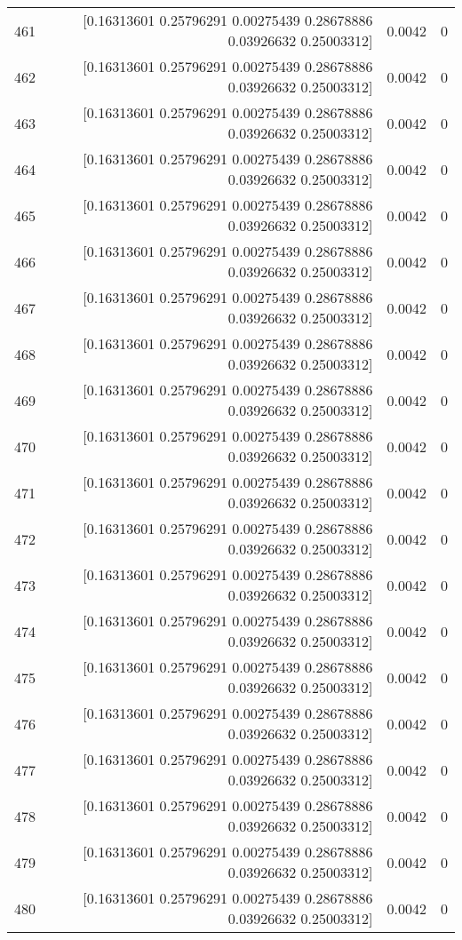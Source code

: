 \begin{longtable}{lrrr}
461 & [0.16313601 0.25796291 0.00275439 0.28678886 0.03926632 0.25003312] & 0.0042 & 0 \\
462 & [0.16313601 0.25796291 0.00275439 0.28678886 0.03926632 0.25003312] & 0.0042 & 0 \\
463 & [0.16313601 0.25796291 0.00275439 0.28678886 0.03926632 0.25003312] & 0.0042 & 0 \\
464 & [0.16313601 0.25796291 0.00275439 0.28678886 0.03926632 0.25003312] & 0.0042 & 0 \\
465 & [0.16313601 0.25796291 0.00275439 0.28678886 0.03926632 0.25003312] & 0.0042 & 0 \\
466 & [0.16313601 0.25796291 0.00275439 0.28678886 0.03926632 0.25003312] & 0.0042 & 0 \\
467 & [0.16313601 0.25796291 0.00275439 0.28678886 0.03926632 0.25003312] & 0.0042 & 0 \\
468 & [0.16313601 0.25796291 0.00275439 0.28678886 0.03926632 0.25003312] & 0.0042 & 0 \\
469 & [0.16313601 0.25796291 0.00275439 0.28678886 0.03926632 0.25003312] & 0.0042 & 0 \\
470 & [0.16313601 0.25796291 0.00275439 0.28678886 0.03926632 0.25003312] & 0.0042 & 0 \\
471 & [0.16313601 0.25796291 0.00275439 0.28678886 0.03926632 0.25003312] & 0.0042 & 0 \\
472 & [0.16313601 0.25796291 0.00275439 0.28678886 0.03926632 0.25003312] & 0.0042 & 0 \\
473 & [0.16313601 0.25796291 0.00275439 0.28678886 0.03926632 0.25003312] & 0.0042 & 0 \\
474 & [0.16313601 0.25796291 0.00275439 0.28678886 0.03926632 0.25003312] & 0.0042 & 0 \\
475 & [0.16313601 0.25796291 0.00275439 0.28678886 0.03926632 0.25003312] & 0.0042 & 0 \\
476 & [0.16313601 0.25796291 0.00275439 0.28678886 0.03926632 0.25003312] & 0.0042 & 0 \\
477 & [0.16313601 0.25796291 0.00275439 0.28678886 0.03926632 0.25003312] & 0.0042 & 0 \\
478 & [0.16313601 0.25796291 0.00275439 0.28678886 0.03926632 0.25003312] & 0.0042 & 0 \\
479 & [0.16313601 0.25796291 0.00275439 0.28678886 0.03926632 0.25003312] & 0.0042 & 0 \\
480 & [0.16313601 0.25796291 0.00275439 0.28678886 0.03926632 0.25003312] & 0.0042 & 0 \\

\end{longtable}
